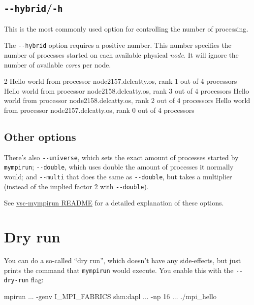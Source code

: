 \subsection{\texttt{-{}-hybrid}/\texttt{-h}}

This is the most commonly used option for controlling the number of processing.

The \lstinline|--hybrid| option requires a positive number. This number specifies
the number of processes started on each available physical \emph{node}. It will ignore
the number of available \emph{cores} per node.

\begin{prompt}
2
Hello world from processor node2157.delcatty.os, rank 1 out of 4 processors
Hello world from processor node2158.delcatty.os, rank 3 out of 4 processors
Hello world from processor node2158.delcatty.os, rank 2 out of 4 processors
Hello world from processor node2157.delcatty.os, rank 0 out of 4 processors
\end{prompt}

\subsection{Other options}

There's also \lstinline|--universe|, which sets the exact amount of processes started by \lstinline|mympirun|;
\lstinline|--double|, which uses double the amount of processes it normally would;
and \lstinline|--multi| that does the same as \lstinline|--double|, but takes a multiplier
(instead of the implied factor 2 with \lstinline|--double|).

See \href{https://github.com/hpcugent/vsc-mympirun/blob/master/README.md}{vsc-mympirun README}
for a detailed explanation of these options.

\section{Dry run}

You can do a so-called ``dry run'', which doesn't have any side-effects, but just
prints the command that \lstinline|mympirun| would execute. You enable this with the \lstinline|--dry-run| flag:

\begin{prompt}
mpirun ... -genv I_MPI_FABRICS shm:dapl ... -np 16 ... ./mpi_hello
\end{prompt}

